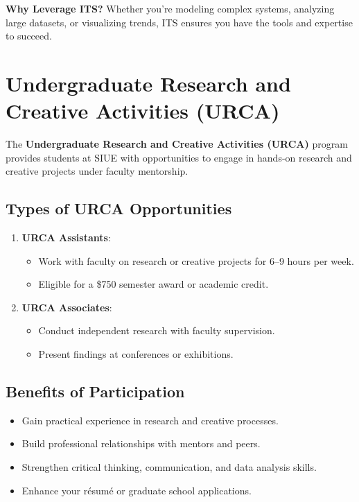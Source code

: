 \documentclass[
]{book}
\providecommand{\tightlist}{%
  \setlength{\itemsep}{0pt}\setlength{\parskip}{0pt}}
\begin{document}
\textbf{Why Leverage ITS?} Whether you're modeling complex systems, analyzing large datasets, or visualizing trends, ITS ensures you have the tools and expertise to succeed.

\section{Undergraduate Research and Creative Activities (URCA)}\label{undergraduate-research-and-creative-activities-urca}

The \textbf{Undergraduate Research and Creative Activities (URCA)} program provides students at SIUE with opportunities to engage in hands-on research and creative projects under faculty mentorship.

\subsection*{Types of URCA Opportunities}\label{types-of-urca-opportunities}

\begin{enumerate}
\def\labelenumi{\arabic{enumi}.}
\tightlist
\item
  \textbf{URCA Assistants}:

  \begin{itemize}
  \tightlist
  \item
    Work with faculty on research or creative projects for 6--9 hours per week.
  \item
    Eligible for a \$750 semester award or academic credit.
  \end{itemize}
\item
  \textbf{URCA Associates}:

  \begin{itemize}
  \tightlist
  \item
    Conduct independent research with faculty supervision.
  \item
    Present findings at conferences or exhibitions.
  \end{itemize}
\end{enumerate}

\subsection*{Benefits of Participation}\label{benefits-of-participation}

\begin{itemize}
\tightlist
\item
  Gain practical experience in research and creative processes.
\item
  Build professional relationships with mentors and peers.
\item
  Strengthen critical thinking, communication, and data analysis skills.
\item
  Enhance your résumé or graduate school applications.
\end{itemize}
\end{document}
